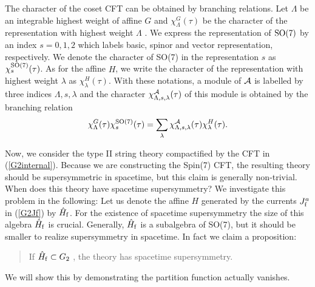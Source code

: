 \documentclass[a4paper,12pt]{article}
\numberwithin{equation}{section}
\newcommand{\Acal}{{\cal A}}
\newcommand{\G}[1]{\mbox{$G_{#1}$}}
\newcommand{\Spin}[1]{{\rm Spin}(#1)}
\newcommand{\SO}[1]{{\rm SO}(#1)}
\newcommand{\Jf}{J_{\rm f}}
\newcommand{\Hf}{\hat{H}_{\rm f}}
\newcommand{\h}[1]{#1}
\renewcommand{\aa}{\h a}
\begin{document}
The character of the coset CFT can be obtained by branching relations.
Let $\Lambda$ be an integrable highest weight of affine $G$ and
$\chi^{G}_{\Lambda}(\tau)$ be the character of the representation with
highest weight $\Lambda$ . We express the representation of $\SO 7$ by
an index $s=0,1,2$ which labels basic, spinor and vector
representation, respectively. We denote the character of \SO 7 in the
representation $s$ as $\chi^{\SO 7}_{s}(\tau)$. As for the affine $H$,
we write the character of the representation with highest weight
$\lambda$ as $\chi^{H}_{\lambda}(\tau)$. With these notations, a module of
$\Acal$ is labelled by three indices $\Lambda,s,\lambda$ and the
character $\chi^{\Acal}_{\Lambda,s,\lambda}(\tau)$ of this module is 
obtained by the branching relation
\begin{align*}
 \chi^{G}_{\Lambda}(\tau)\chi^{\SO 7}_{s}(\tau)
   =\sum_{\lambda}\chi^{\Acal}_{\Lambda,s,\lambda}(\tau)
        \chi^{H}_{\lambda}(\tau).
\end{align*}

Now, we consider the type II string theory compactified by the CFT in
(\ref{G2internal}).  Because we are constructing the \Spin 7 CFT,
the resulting theory should be supersymmetric in spacetime, but this claim
is generally non-trivial.  When does this theory have spacetime
supersymmetry?  We investigate this problem in the following: Let us
denote the affine $H$ generated by the currents $\Jf^{\aa}$ in
(\ref{G2Jf}) by $\Hf$.  For the existence of spacetime supersymmetry the
size of this algebra $\Hf$ is crucial.  Generally, $\Hf$ is a subalgebra
of \SO 7, but it should be smaller to realize supersymmetry in
spacetime.  In fact we claim a proposition:
\begin{quote}
 If $\Hf \subset \G 2$ , the theory has spacetime supersymmetry.
\end{quote}
We will show this by demonstrating the partition function 
actually vanishes.
\end{document}
